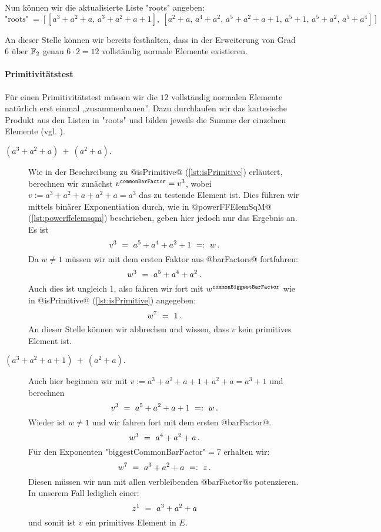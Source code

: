 Nun können wir die aktualisierte Liste "roots" angeben:
\[\text{"roots"}\ =\ \big[\, [a^3+a^2+a,\, a^3+a^2+a+1],\ 
  [a^2+a,\, a^4+a^2,\, a^5+a^2+a+1,\, a^5+1,\, a^5+a^2,\, a^5+a^4]\,\big]\]

An dieser Stelle können wir bereits festhalten, dass in der Erweiterung von
Grad $6$ über $\mathbb{F}_2$ genau $6\cdot 2=12$ vollständig normale Elemente
existieren.

\paragraph{Primitivitätstest}
Für einen Primitivitätstest müssen wir die $12$ vollständig normalen Elemente
natürlich erst einmal „zusammenbauen”. Dazu durchlaufen wir das kartesische
Produkt aus den Listen in "roots" und bilden jeweils die Summe der einzelnen
Elemente (vgl. \thref{def:vertraeglich}).
\begin{description}
  \item[$(a^3+a^2+a)\ +\ (a^2+a).$] 
    Wie in der Beschreibung zu @isPrimitive@ (\autoref{lst:isPrimitive})
    erläutert, berechnen wir zunächst $v^\texttt{\scriptsize commonBarFactor} = v^3$,
    wobei $v := a^3+a^2+a + a^2+a = a^3$ das zu testende Element ist.
    Dies führen wir mittels binärer Exponentiation durch, wie in 
    @powerFFElemSqM@ (\autoref{lst:powerffelemsqm}) beschrieben, geben hier
    jedoch nur das Ergebnis an. Es ist 
    \[ v^3 \ =\   a^5 + a^4 + a^2 + 1 \ =:\  w\,.\]
    Da $w \neq 1$ müssen wir mit dem ersten Faktor aus 
    @barFactors@ fortfahren:
    \[ w^3 \ =\  a^5 + a^4 + a^2\,. \]
    Auch dies ist ungleich $1$, also fahren wir fort mit 
    $w^\texttt{\scriptsize commonBiggestBarFactor}$ wie in 
    @isPrimitive@ (\autoref{lst:isPrimitive}) angegeben:
    \[ w^7 \ =\  1\,.\]
    An dieser Stelle können wir abbrechen und wissen, dass $v$ kein
    primitives Element ist.
  \item[$(a^3+a^2+a+1)\ +\ (a^2+a).$]
    Auch hier beginnen wir mit $v := a^3+a^2+a+1 + a^2+a = a^3+1$ und 
    berechnen
    \[ v^3 \ =\  a^5+a^2+a+1 \ =:\  w \,.\]
    Wieder ist $w\neq 1$ und wir fahren fort mit dem ersten @barFactor@.
    \[ w^3 \ =\  a^4+a^2+a\,.\]
    Für den Exponenten $\text{"biggestCommonBarFactor"} = 7$ erhalten wir:
    \[ w^7 \ =\  a^3+a^2+a \ =:\  z\,.\]
    Diesen müssen wir nun mit allen verbleibenden @barFactor@s potenzieren. In
    unserem Fall lediglich einer:
    \[ z^1 \ =\  a^3+a^2+a \]
    und somit ist $v$ ein primitives Element in $E$.
\end{description}

